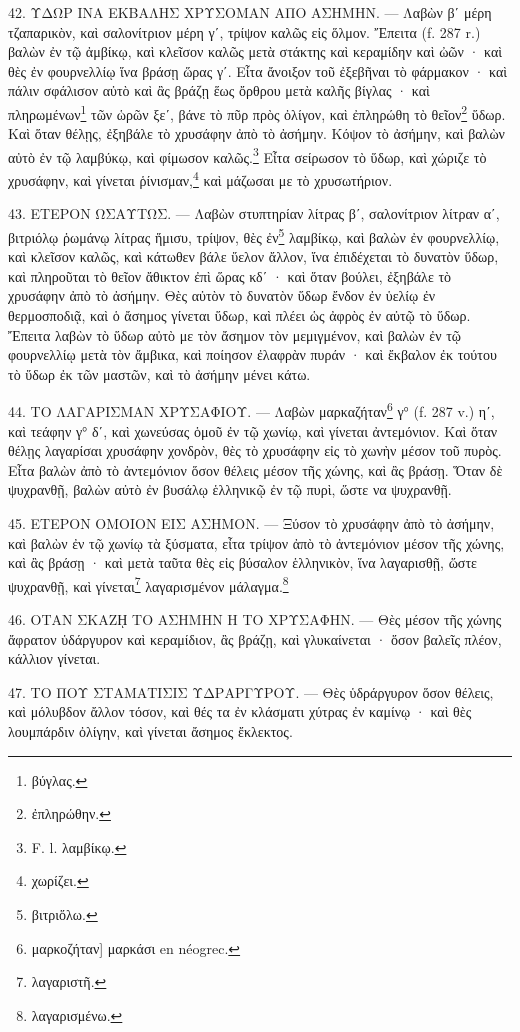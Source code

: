 \documentclass[a4paper, 11pt, oneside, polutonikogreek, french]{article}
\begin{document}
42. ΥΔΩΡ ΙΝΑ ΕΚΒΑΛΗΣ ΧΡΥΣΟΜΑΝ ΑΠΟ ΑΣΗΜΗΝ. --- Λαβὼν βʹ μέρη τζαπαρικὸν, καὶ σαλονίτριον μέρη γʹ, τρίψον καλῶς εἰς ὅλμον. Ἔπειτα (f. 287 r.) βαλὼν ἐν τῷ ἀμβίκῳ, καὶ κλεῖσον καλῶς μετὰ στάκτης καὶ κεραμίδην καὶ ὠῶν · καὶ θὲς ἐν φουρνελλίῳ ἵνα βράσῃ ὥρας γʹ. Εἶτα ἄνοιξον τοῦ ἐξεβῆναι τὸ φάρμακον · καὶ πάλιν σφάλισον αὐτὸ καὶ ἂς βράζῃ ἕως ὄρθρου μετὰ καλῆς βίγλας · καὶ πληρωμένων\footnote{βύγλας.} τῶν ὡρῶν ξεʹ, βάνε τὸ πῦρ πρὸς ὀλίγον, καὶ ἐπληρώθη τὸ θεῖον\footnote{ἐπληρώθην.} ὕδωρ. Καὶ ὅταν θέλῃς, ἐξηβάλε τὸ χρυσάφην ἀπὸ τὸ ἀσήμην. Κόψον τὸ ἀσήμην, καὶ βαλὼν αὐτὸ ἐν τῷ λαμβύκῳ, καὶ φίμωσον καλῶς.\footnote{F. l. λαμβίκῳ.} Εἶτα σείρωσον τὸ ὕδωρ, καὶ χώριζε τὸ χρυσάφην, καὶ γίνεται ῥίνισμαν,\footnote{χωρίζει.} καὶ μάζωσαι με τὸ χρυσωτήριον.

43. ΕΤΕΡΟΝ ΩΣΑΥΤΩΣ. --- Λαβὼν στυπτηρίαν λίτρας βʹ, σαλονίτριον λίτραν αʹ, βιτριόλῳ ῥωμάνῳ λίτρας ἥμισυ, τρίψον, θὲς ἐν\footnote{βιτριὅλω.} λαμβίκῳ, καὶ βαλὼν ἐν φουρνελλίῳ, καὶ κλεῖσον καλῶς, καὶ κάτωθεν βάλε ὕελον ἄλλον, ἵνα ἐπιδέχεται τὸ δυνατὸν ὕδωρ, καὶ πληροῦται τὸ θεῖον ἄθικτον ἐπὶ ὥρας κδʹ · καὶ ὅταν βούλει, ἐξηβάλε τὸ χρυσάφην ἀπὸ τὸ ἀσήμην. Θὲς αὐτὸν τὸ δυνατὸν ὕδωρ ἔνδον ἐν ὑελίῳ ἐν θερμοσποδιᾷ, καὶ ὁ ἄσημος γίνεται ὕδωρ, καὶ πλέει ὡς ἀφρὸς ἐν αὐτῷ τὸ ὕδωρ. Ἔπειτα λαβὼν τὸ ὕδωρ αὐτὸ με τὸν ἄσημον τὸν μεμιγμένον, καὶ βαλὼν ἐν τῷ φουρνελλίῳ μετὰ τὸν ἄμβικα, καὶ ποίησον ἐλαφρὰν πυράν · καὶ ἔκβαλον ἐκ τούτου τὸ ὕδωρ ἐκ τῶν μαστῶν, καὶ τὸ ἀσήμην μένει κάτω.

44. ΤΟ ΛΑΓΑΡΙΣΜΑΝ ΧΡΥΣΑΦΙΟΥ. --- Λαβὼν μαρκαζήταν\footnote{μαρκοζήταν] μαρκάσι en néogrec.} γ° (f. 287 v.) ηʹ, καὶ τεάφην γ° δʹ, καὶ χωνεύσας ὁμοῦ ἐν τῷ χωνίῳ, καὶ γίνεται ἀντεμόνιον. Καὶ ὅταν θέλῃς λαγαρίσαι χρυσάφην χονδρὸν, θὲς τὸ χρυσάφην εἰς τὸ χωνὴν μέσον τοῦ πυρὸς. Εἶτα βαλὼν ἀπὸ τὸ ἀντεμόνιον ὅσον θέλεις μέσον τῆς χώνης, καὶ ἂς βράσῃ. Ὅταν δὲ ψυχρανθῇ, βαλὼν αὐτὸ ἐν βυσάλῳ ἑλληνικῷ ἐν τῷ πυρὶ, ὥστε να ψυχρανθῇ.

45. ΕΤΕΡΟΝ ΟΜΟΙΟΝ ΕΙΣ ΑΣΗΜΟΝ. --- Ξύσον τὸ χρυσάφην ἀπὸ τὸ ἀσήμην, καὶ βαλὼν ἐν τῷ χωνίῳ τὰ ξύσματα, εἶτα τρίψον ἀπὸ τὸ ἀντεμόνιον μέσον τῆς χώνης, καὶ ἂς βράσῃ · καὶ μετὰ ταῦτα θὲς εἰς βύσαλον ἑλληνικὸν, ἵνα λαγαρισθῇ, ὥστε ψυχρανθῇ, καὶ γίνεται\footnote{λαγαριστῆ.} λαγαρισμένον μάλαγμα.\footnote{λαγαρισμένω.}

46. ΟΤΑΝ ΣΚΑΖῌ ΤΟ ΑΣΗΜΗΝ Η ΤΟ ΧΡΥΣΑΦΗΝ. --- Θὲς μέσον τῆς χώνης ἄφρατον ὑδάργυρον καὶ κεραμίδιον, ἂς βράζῃ, καὶ γλυκαίνεται · ὅσον βαλεῖς πλέον, κάλλιον γίνεται.

47. ΤΟ ΠΟΥ ΣΤΑΜΑΤΙΣΙΣ ΥΔΡΑΡΓΥΡΟΥ. --- Θὲς ὑδράργυρον ὅσον θέλεις, καὶ μόλυβδον ἄλλον τόσον, καὶ θές τα ἐν κλάσματι χύτρας ἐν καμίνῳ · καὶ θὲς λουμπάρδιν ὀλίγην, καὶ γίνεται ἄσημος ἔκλεκτος.
\end{document}
